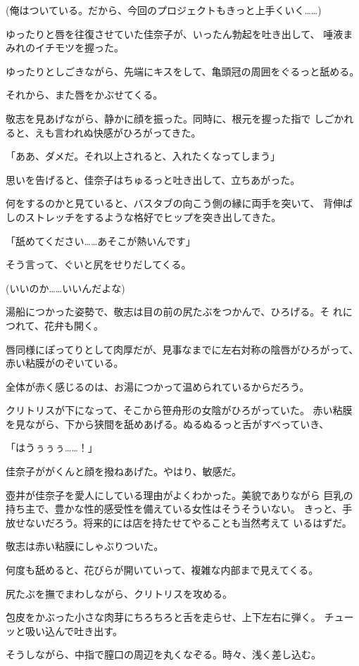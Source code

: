 ﻿\documentclass[
    book,tate,
    line_length=30zw,
    jafontsize=12pt,
    paper=b5j,
    landscape,
    ]{jlreq}
\begin{document}
(俺はついている。だから、今回のプロジェクトもきっと上手くいく……)

ゆったりと唇を往復させていた佳奈子が、いったん勃起を吐き出して、
唾液まみれのイチモツを握った。

ゆったりとしごきながら、先端にキスをして、亀頭冠の周囲をぐるっと舐める。

それから、また唇をかぶせてくる。

敬志を見あげながら、静かに顔を振った。同時に、根元を握った指で
しごかれると、えも言われぬ快感がひろがってきた。

「ああ、ダメだ。それ以上されると、入れたくなってしまう」

思いを告げると、佳奈子はちゅるっと吐き出して、立ちあがった。

何をするのかと見ていると、バスタブの向こう側の縁に両手を突いて、
背伸ばしのストレッチをするような格好でヒップを突き出してきた。

「舐めてください……あそこが熱いんです」

そう言って、ぐいと尻をせりだしてくる。

(いいのか……いいんだよな)

湯船につかった姿勢で、敬志は目の前の尻たぶをつかんで、ひろげる。そ
れにつれて、花弁も開く。

唇同様にぽってりとして肉厚だが、見事なまでに左右対称の陰唇がひろがって、
赤い粘膜がのぞいている。

全体が赤く感じるのは、お湯につかって温められているからだろう。

クリトリスが下になって、そこから笹舟形の女陰がひろがっていた。
赤い粘膜を見ながら、下から狭間を舐めあげる。ぬるぬるっと舌がすべっていき、

「はうぅぅぅ……！」

佳奈子ががくんと顔を撥ねあげた。やはり、敏感だ。

壺井が佳奈子を愛人にしている理由がよくわかった。美貌でありながら
巨乳の持ち主で、豊かな性的感受性を備えている女性はそうそういない。
きっと、手放せないだろう。将来的には店を持たせてやることも当然考えて
いるはずだ。

敬志は赤い粘膜にしゃぶりついた。

何度も舐めると、花びらが開いていって、複雑な内部まで見えてくる。

尻たぶを撫でまわしながら、クリトリスを攻める。

包皮をかぶった小さな肉芽にちろちろと舌を走らせ、上下左右に弾く。
チューッと吸い込んで吐き出す。 

そうしながら、中指で膣口の周辺を丸くなぞる。時々、浅く差し込む。
\end{document}
